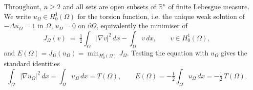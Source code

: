 \documentclass[11pt]{amsart}
\theoremstyle{definition}
\newcommand{\R}{\mathbb R}
\newcommand{\Om}{\Omega}
\newcommand{\abs}[1]{\left|#1\right|}
\newcommand{\dx}{\,dx}
\begin{document}
Throughout, $n\ge2$ and all sets are open subsets of $\R^n$ of finite
Lebesgue measure. We write $u_\Om\in H^1_0(\Om)$ for the torsion
function, i.e. the unique weak solution of $-\Delta u_\Om=1$ in $\Om$,
$u_\Om=0$ on $\partial\Om$, equivalently the minimiser of
\begin{equation}\label{eq:energy-def}
   J_\Om(v)\;=\;\tfrac12\int_\Om\abs{\nabla v}^2\dx-\int_\Om v\dx,
   \qquad v\in H^1_0(\Om),
\end{equation}
and $E(\Om)=J_\Om(u_\Om)=\min_{H^1_0(\Om)}J_\Om$.
Testing the equation with $u_\Om$ gives the standard identities
\begin{equation}\label{eq:energy-identities}
   \int_\Om\abs{\nabla u_\Om}^2\dx=\int_\Om u_\Om\dx=T(\Om),
   \qquad
   E(\Om)=-\tfrac12\int_\Om u_\Om\dx=-\tfrac12\,T(\Om).
\end{equation}
\end{document}

